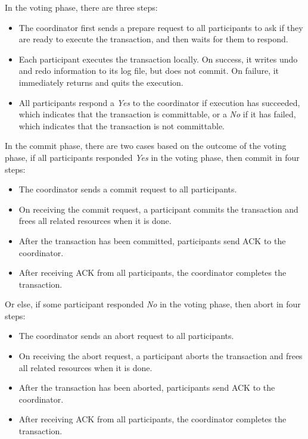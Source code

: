 \documentclass[11pt]{article}
\begin{document}
    \noindent In the voting phase, there are three steps:
    \begin{itemize}
      \item The coordinator first sends a prepare request to all participants to ask if they are ready to execute the transaction, and then waits for them to respond.
      \item Each participant executes the transaction locally. On success, it writes undo and redo information to its log file, but does not commit. On failure, it immediately returns and quits the execution.
      \item All participants respond a \textit{Yes} to the coordinator if execution has succeeded, which indicates that the transaction is committable, or a \textit{No} if it has failed, which indicates that the transaction is not committable.
    \end{itemize}

    \noindent In the commit phase, there are two cases based on the outcome of the voting phase, if all participants responded \textit{Yes} in the voting phase, then commit in four steps:
    \begin{itemize}
      \item The coordinator sends a commit request to all participants.
      \item On receiving the commit request, a participant commits the transaction and frees all related resources when it is done.
      \item After the transaction has been committed, participants send \small{ACK} \normalsize to the coordinator.
      \item After receiving \small{ACK} \normalsize from all participants, the coordinator completes the transaction.
    \end{itemize}

    \noindent Or else, if some participant responded \textit{No} in the voting phase, then abort in four steps:
    \begin{itemize}
      \item The coordinator sends an abort request to all participants.
      \item On receiving the abort request, a participant aborts the transaction and frees all related resources when it is done.
      \item After the transaction has been aborted, participants send \small{ACK} \normalsize to the coordinator.
      \item After receiving \small{ACK} \normalsize from all participants, the coordinator completes the transaction.
    \end{itemize}
\end{document}
